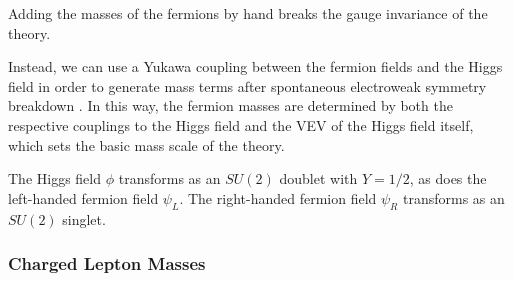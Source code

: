 Adding the masses of the fermions by hand breaks the gauge invariance of the theory.
%

%
Instead, we can use a Yukawa coupling between the fermion fields and the Higgs field in order to generate mass terms after spontaneous electroweak symmetry breakdown \cite{Weinberg:1967tq}.
In this way, the fermion masses are determined by both the respective couplings to the Higgs field and the VEV of the Higgs field itself, which sets the basic mass scale of the theory.

The Higgs field $\phi$ transforms as an $SU(2)$ doublet with $Y = 1/2$, as does the left-handed fermion field $\psi_L$.
The right-handed fermion field $\psi_R$ transforms as an $SU(2)$ singlet.

\subsubsection{Charged Lepton Masses}

